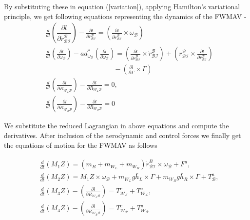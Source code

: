 \documentclass[letterpaper, 10 pt, conference]{ieeeconf}  \newcommand{\RN}[1]{\textup{\uppercase\expandafter{\romannumeral#1}}}
\begin{document}
By substituting these in equation (\ref{variation}), applying Hamilton's variational principle, we get following equations representing the dynamics of the FWMAV -
\begin{align}
& \frac{d}{dt}\left(\dfrac{\partial l}{\partial \dot{r}_{\mathcal{BI}}^{\mathcal{B}}}\right) - \frac{\partial l}{\partial r_{\mathcal{BI}}^{\mathcal{B}}} = \left(\frac{\partial l}{\partial \dot{r}_{\mathcal{BI}}^{\mathcal{B}}}\times \omega_{\mathcal{B}} \right) \nonumber \\
& \frac{d}{dt}  \left(\frac{\partial l}{ \partial \omega_{\mathcal{B}}}\right) - ad_{\omega_{\mathcal{B}}}^{\ast} \left(\frac{\partial l}{\partial \omega_{\mathcal{B}}} \right) =  \left(\frac{\partial l}{\partial \dot{r}_{\mathcal{BI}}^{\mathcal{B}}} \times \dot{r}_{\mathcal{BI}}^{\mathcal{B}} \right) + \left( r_{\mathcal{BI}}^{\mathcal{B}} \times \frac{\partial l}{\partial r_{\mathcal{BI}}^{\mathcal{B}}} \right) \nonumber \\
& \qquad \qquad\qquad\qquad\qquad -\left(\frac{\partial l}{\partial \Gamma} \times \Gamma \right) \nonumber \\
& \frac{d}{dt}\left(\frac{\partial l}{\partial \dot{R}_{\mathcal{W_LB}}} \right) - \frac{\partial l}{\partial R_{\mathcal{W_LB}}} = 0, \nonumber \\
& \frac{d}{dt}\left(\frac{\partial l}{\partial \dot{R}_{\mathcal{W_RB}}}\right) - \frac{\partial l}{\partial R_{\mathcal{W_RB}}} = 0 \label{dynamics}
\end{align}

We substitute the reduced Lagrangian in above equations and compute the derivatives. After inclusion of the aerodynamic and control forces we finally get the equations of motion for the FWMAV as follows

\begin{align}\label{final_dyn}
\begin{split}
& \frac{d}{dt} \left( M_{1} Z \right) =  (m_{B} + m_{W_L} + m_{W_R}) \dot{r}_{\mathcal{BI}}^{B}\times \omega_\mathcal{B} + F^{a}, \\
& \frac{d}{dt} \left( M_{2} Z \right) = M_{1}Z \times \omega_{\mathcal{B}} + m_{W_{L}}g \bar{h}_L \times \Gamma + m_{W_{R}}g \bar{h}_R \times \Gamma +T^{a}_\mathcal{B},\\
& \frac{d}{dt} \left( M_{3} Z \right) - \left( \frac{\partial l}{\partial R_{\mathcal{W_LB}}} \right) = T^{c}_\mathcal{W_L}+T^{a}_\mathcal{W_L}, \\
& \frac{d}{dt} \left( M_{4} Z \right) - \left( \frac{\partial l}{\partial R_{\mathcal{W_RB}}} \right) = T^{c}_\mathcal{W_R}+T^{a}_\mathcal{W_R}
\end{split}
\end{align}
\end{document}
